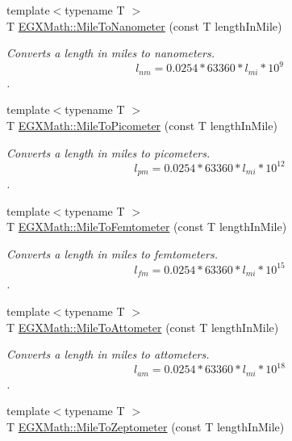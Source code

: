 \begin{DoxyCompactItemize}
{\footnotesize template$<$typename T $>$ }\\T \mbox{\hyperlink{group___e_g_x_math-_conversions-_length_conversions-_imperial-_mile-_s_i_ga7c25082c389858e2dacd450005dc78c7}{E\+G\+X\+Math\+::\+Mile\+To\+Nanometer}} (const T length\+In\+Mile)
\begin{DoxyCompactList}\small\item\em Converts a length in miles to nanometers. \[ l_{nm}=0.0254 * 63360 * l_{mi} * 10^{9} \]. \end{DoxyCompactList}\item 
{\footnotesize template$<$typename T $>$ }\\T \mbox{\hyperlink{group___e_g_x_math-_conversions-_length_conversions-_imperial-_mile-_s_i_ga470a1271de988c28cb4851e5930d99da}{E\+G\+X\+Math\+::\+Mile\+To\+Picometer}} (const T length\+In\+Mile)
\begin{DoxyCompactList}\small\item\em Converts a length in miles to picometers. \[ l_{pm}=0.0254 * 63360 * l_{mi} * 10^{12} \]. \end{DoxyCompactList}\item 
{\footnotesize template$<$typename T $>$ }\\T \mbox{\hyperlink{group___e_g_x_math-_conversions-_length_conversions-_imperial-_mile-_s_i_ga760e3af0fd7e18bf8ece567008891e42}{E\+G\+X\+Math\+::\+Mile\+To\+Femtometer}} (const T length\+In\+Mile)
\begin{DoxyCompactList}\small\item\em Converts a length in miles to femtometers. \[ l_{fm}=0.0254 * 63360 * l_{mi} * 10^{15} \]. \end{DoxyCompactList}\item 
{\footnotesize template$<$typename T $>$ }\\T \mbox{\hyperlink{group___e_g_x_math-_conversions-_length_conversions-_imperial-_mile-_s_i_gafcc088753cafd9bf783abc87dd37a8d9}{E\+G\+X\+Math\+::\+Mile\+To\+Attometer}} (const T length\+In\+Mile)
\begin{DoxyCompactList}\small\item\em Converts a length in miles to attometers. \[ l_{am}=0.0254 * 63360 * l_{mi} * 10^{18} \]. \end{DoxyCompactList}\item 
{\footnotesize template$<$typename T $>$ }\\T \mbox{\hyperlink{group___e_g_x_math-_conversions-_length_conversions-_imperial-_mile-_s_i_gaa9bfa89d95751e47208d10259bc7ac9c}{E\+G\+X\+Math\+::\+Mile\+To\+Zeptometer}} (const T length\+In\+Mile)

\end{DoxyCompactItemize}
